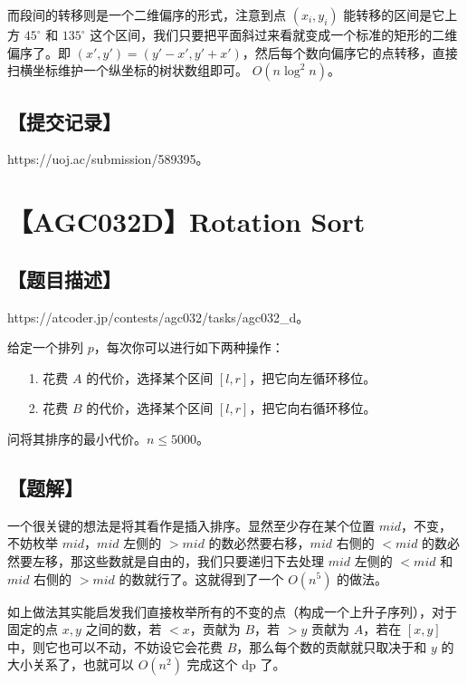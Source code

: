 \documentclass[UTF8,12pt,a4paper]{ctexart}
\begin{document}
	而段间的转移则是一个二维偏序的形式，注意到点 $(x_i,y_i)$ 能转移的区间是它上方 $45^{\circ}$ 和 $135^{\circ}$ 这个区间，我们只要把平面斜过来看就变成一个标准的矩形的二维偏序了。即 $(x',y')=(y'-x',y'+x')$，然后每个数向偏序它的点转移，直接扫横坐标维护一个纵坐标的树状数组即可。 $O(n\log^2 n)$。
	
	\subsection*{【提交记录】}
	
	https://uoj.ac/submission/589395。
	
	
	\section*{【AGC032D】Rotation Sort}
	
	\subsection*{【题目描述】}
	
	https://atcoder.jp/contests/agc032/tasks/agc032\_d。
	
	给定一个排列 $p$，每次你可以进行如下两种操作：
	
	\begin{itemize}
		\item [1.] 花费 $A$ 的代价，选择某个区间 $[l,r]$，把它向左循环移位。
		\item [2.] 花费 $B$ 的代价，选择某个区间 $[l,r]$，把它向右循环移位。
	\end{itemize}

	问将其排序的最小代价。$n\le 5000$。
	
	\subsection*{【题解】}
	
	一个很关键的想法是将其看作是插入排序。显然至少存在某个位置 $mid$，不变，不妨枚举 $mid$，$mid$ 左侧的 $>mid$ 的数必然要右移，$mid$ 右侧的 $<mid$ 的数必然要左移，那这些数就是自由的，我们只要递归下去处理 $mid$ 左侧的 $<mid$ 和 $mid$ 右侧的 $>mid$ 的数就行了。这就得到了一个 $O(n^5)$ 的做法。
	
	如上做法其实能启发我们直接枚举所有的不变的点（构成一个上升子序列），对于固定的点 $x,y$ 之间的数，若 $<x$，贡献为 $B$，若 $>y$ 贡献为 $A$，若在 $[x,y]$ 中，则它也可以不动，不妨设它会花费 $B$，那么每个数的贡献就只取决于和 $y$ 的大小关系了，也就可以 $O(n^2)$ 完成这个 dp 了。
	
\end{document}
